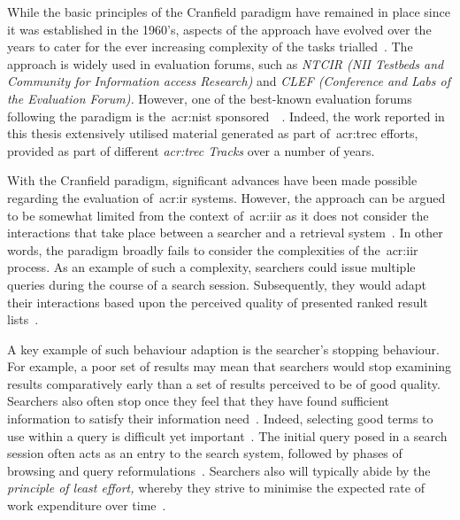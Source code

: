 While the basic principles of the Cranfield paradigm have remained in place since it was established in the 1960's, aspects of the approach have evolved over the years to cater for the ever increasing complexity of the tasks trialled~\citep{harman2010cranfield}. The approach is widely used in evaluation forums, such as \emph{NTCIR (NII Testbeds and Community for Information access Research)} and \emph{CLEF (Conference and Labs of the Evaluation Forum).} However, one of the best-known evaluation forums following the paradigm is the~\gls{acr:nist} sponsored~~\citep{harman1993trec1}. Indeed, the work reported in this thesis extensively utilised material generated as part of~\gls{acr:trec} efforts, provided as part of different \emph{\gls{acr:trec} Tracks} over a number of years.

With the Cranfield paradigm, significant advances have been made possible regarding the evaluation of~\gls{acr:ir} systems. However, the approach can be argued to be somewhat limited from the context of~\gls{acr:iir} as it does not consider the interactions that take place between a searcher and a retrieval system~\citep{borlund2000evaluation_iir, ingwersen2005theturn}. In other words, the paradigm broadly fails to consider the complexities of the~\gls{acr:iir} process. As an example of such a complexity, searchers could issue multiple queries during the course of a search session. Subsequently, they would adapt their interactions based upon the perceived quality of presented ranked result lists~\citep{moffat2013users_versus_models}.

A key example of such behaviour adaption is the searcher's stopping behaviour. For example, a poor set of results may mean that searchers would stop examining results comparatively early than a set of results perceived to be of good quality. Searchers also often stop once they feel that they have found sufficient information to satisfy their information need~\citep{zach2005enough_is_enough}. Indeed, selecting good terms to use within a query is difficult yet important~\citep{efthimiadis2000query_expansion}. The initial query posed in a search session often acts as an entry to the search system, followed by phases of browsing and query reformulations~\citep{marchionini1993information_seeking}. Searchers also will typically abide by the \emph{principle of least effort,} whereby they strive to minimise the expected rate of work expenditure over time~\citep{zipf1949behaviour}.


